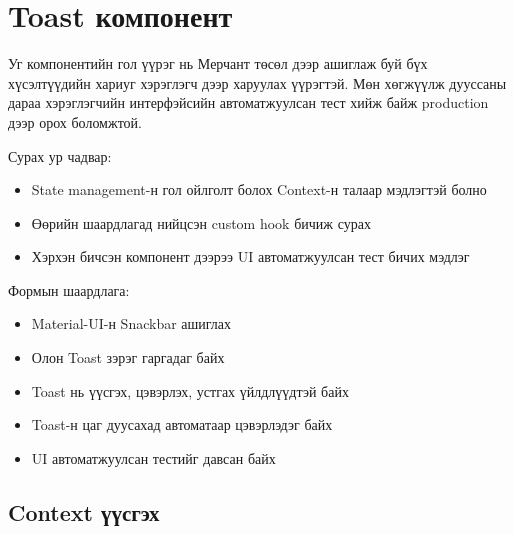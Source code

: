 \section{Toast компонент}

Уг компонентийн гол үүрэг нь Мерчант төсөл дээр ашиглаж буй бүх хүсэлтүүдийн хариуг хэрэглэгч дээр харуулах үүрэгтэй. Мөн хөгжүүлж дууссаны дараа хэрэглэгчийн интерфэйсийн автоматжуулсан тест хийж байж production дээр орох боломжтой.

Сурах ур чадвар: 
\begin{itemize}
    \item State management-н гол ойлголт болох Context-н талаар мэдлэгтэй болно
    \item Өөрийн шаардлагад нийцсэн custom hook бичиж сурах
    \item Хэрхэн бичсэн компонент дээрээ UI автоматжуулсан тест бичих мэдлэг
\end{itemize}

Формын шаардлага: 
\begin{itemize}
    \item Material-UI-н Snackbar ашиглах
    \item Олон Toast зэрэг гаргадаг байх
    \item Toast нь үүсгэх, цэвэрлэх, устгах үйлдлүүдтэй байх
    \item Toast-н цаг дуусахад автоматаар цэвэрлэдэг байх
    \item UI автоматжуулсан тестийг давсан байх
\end{itemize}

\subsection{Context үүсгэх}